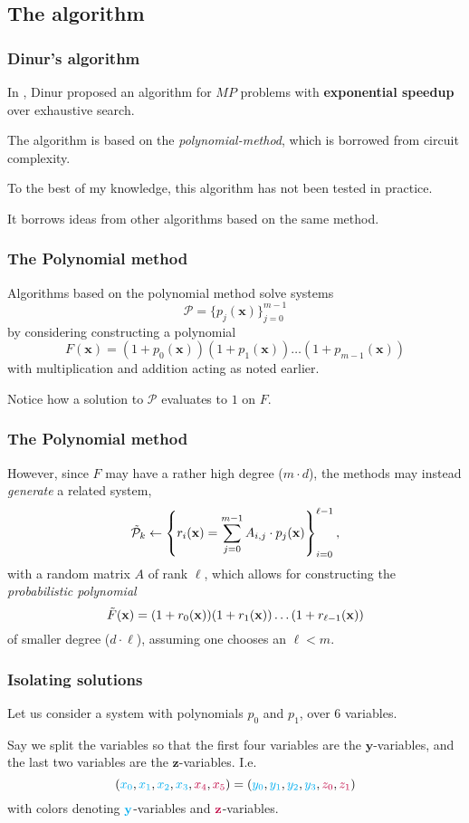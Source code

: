 \documentclass{beamer}
\begin{document}
\subsection{The algorithm}
\begin{frame}
    \frametitle{Dinur's algorithm}
    In \cite{eurocrypt-2021-30841}, Dinur proposed an algorithm for $MP$ problems with \textbf{exponential speedup} over exhaustive search.

    The algorithm is based on the \textit{polynomial-method}, which is borrowed from circuit complexity.

    To the best of my knowledge, this algorithm has not been tested in practice.

    It borrows ideas from other algorithms based on the same method.
\end{frame}

\begin{frame}
    \frametitle{The Polynomial method}
    Algorithms based on the polynomial method solve systems 
    $$
        \mathcal{P} = \{p_j(\mathbf{x})\}^{m - 1}_{j = 0}
    $$ 
    by considering constructing a polynomial 
    $$
        F(\mathbf{x}) = (1 + p_0(\mathbf{x}))(1 + p_1(\mathbf{x})) \dots (1 + p_{m - 1}(\mathbf{x}))
    $$
    with multiplication and addition acting as noted earlier.

    Notice how a solution to $\mathcal{P}$ evaluates to $1$ on $F$.
\end{frame}

\begin{frame}
    \frametitle{The Polynomial method}
    However, since $F$ may have a rather high degree ($m \cdot d$), the methods may instead \textit{generate} a related system, 
    $$
        \Tilde{\mathcal{P}}_k \gets \left\{r_i(\mathbf{x}) = \sum_{j = 0}^{m-1}A_{i,j} \cdot p_j(\mathbf{x})\right\}^{\ell - 1}_{i = 0},
    $$
    with a random matrix $A$ of rank $\ell$, which allows for constructing the \textit{probabilistic polynomial}
    $$
        \Tilde{F}(\mathbf{x}) = (1 + r_0(\mathbf{x}))(1 + r_1(\mathbf{x})) \dots (1 + r_{\ell - 1}(\mathbf{x})) 
    $$
    of smaller degree ($d \cdot \ell$), assuming one chooses an $\ell < m$.
\end{frame}

\begin{frame}
    \frametitle{Isolating solutions}
    Let us consider a system with polynomials $p_0$ and $p_1$, over $6$ variables. 

    \pause
    Say we split the variables so that the first four variables are the $\mathbf{y}$-variables, and the last two variables are the $\mathbf{z}$-variables. I.e. 
    $$
        ({\color{cyan}x_0}, {\color{cyan}x_1}, {\color{cyan}x_2}, {\color{cyan}x_3}, {\color{purple}x_4}, {\color{purple}x_5}) = ({\color{cyan}y_0}, {\color{cyan}y_1}, {\color{cyan}y_2}, {\color{cyan}y_3}, {\color{purple}z_0}, {\color{purple}z_1})
    $$
    with colors denoting $\color{cyan}\mathbf{y}$-variables and $\color{purple}\mathbf{z}$-variables.
\end{frame}
\end{document}
